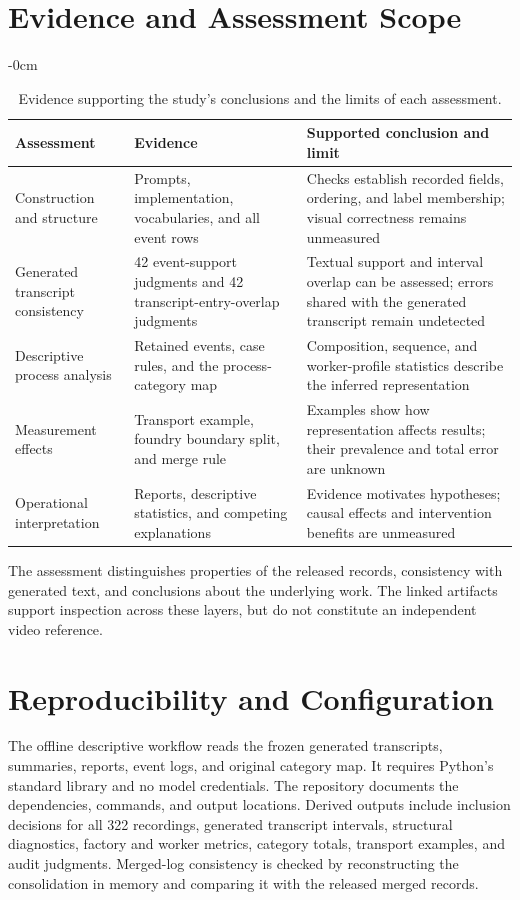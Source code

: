\section{Evidence and Assessment Scope}
\label{app:extension}
\begin{table}[!b]\begin{adjustwidth}{-\extralength}{0cm}
\caption{Evidence supporting the study's conclusions and the limits of each assessment.}
\label{tab:extension}\footnotesize
\begin{tabularx}{\linewidth}{@{}LLL@{}}\toprule
Assessment & Evidence & Supported conclusion and limit \\\midrule
Construction and structure & Prompts, implementation, vocabularies, and all event rows & Checks establish recorded fields, ordering, and label membership; visual correctness remains unmeasured \\
Generated transcript consistency & 42 event-support judgments and 42 transcript-entry-overlap judgments & Textual support and interval overlap can be assessed; errors shared with the generated transcript remain undetected \\
Descriptive process analysis & Retained events, case rules, and the process-category map & Composition, sequence, and worker-profile statistics describe the inferred representation \\
Measurement effects & Transport example, foundry boundary split, and merge rule & Examples show how representation affects results; their prevalence and total error are unknown \\
Operational interpretation & Reports, descriptive statistics, and competing explanations & Evidence motivates hypotheses; causal effects and intervention benefits are unmeasured \\
\bottomrule\end{tabularx}
\end{adjustwidth}\end{table}

The assessment distinguishes properties of the released records, consistency with generated text, and conclusions about the underlying work. The linked artifacts support inspection across these layers, but do not constitute an independent video reference.

\section{Reproducibility and Configuration}
\label{app:repro}
The offline descriptive workflow reads the frozen generated transcripts, summaries, reports, event logs, and original category map. It requires Python's standard library and no model credentials. The repository documents the dependencies, commands, and output locations. Derived outputs include inclusion decisions for all 322 recordings, generated transcript intervals, structural diagnostics, factory and worker metrics, category totals, transport examples, and audit judgments. Merged-log consistency is checked by reconstructing the consolidation in memory and comparing it with the released merged records.

